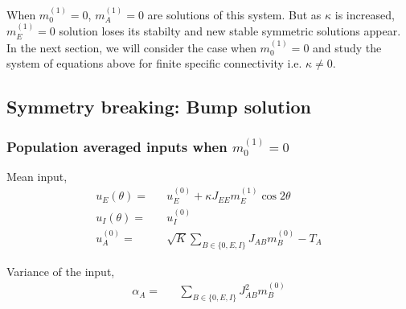When $m_0^{(1)} = 0$, $m_A^{(1)} = 0$ are solutions of this system. But as $\kappa$ is increased, $m_E^{(1)} = 0$ solution loses its stabilty and new stable symmetric solutions appear. In the next section, we will consider the case when $m_0^{(1)} = 0$ and study the system of equations above for finite specific connectivity i.e. $\kappa \ne 0$. 
\subsection{\label{subsec:symbreak}Symmetry breaking: Bump solution} 
\subsubsection{Population averaged inputs when  $m_0^{(1)} = 0$}
Mean input, \\
\begin{eqnarray}
u_E(\theta) =&& u^{(0)}_E + \kappa J_{EE} m_E^{(1)} \cos 2 \theta \\
u_I(\theta) =&& u^{(0)}_I \label{uITeq} \\
u^{(0)}_A =&& \sqrt{K} \sum_{B \in \lbrace 0, E, I\rbrace} J_{AB} m_B^{(0)}  - T_A\label{uaTeq} 
\end{eqnarray}

Variance of the input,\\
\begin{eqnarray}
\alpha_A =&& \sum_{B \in \lbrace 0, E, I\rbrace} J_{AB}^2 m_B^{(0)} \label{alphaE}
\end{eqnarray}

